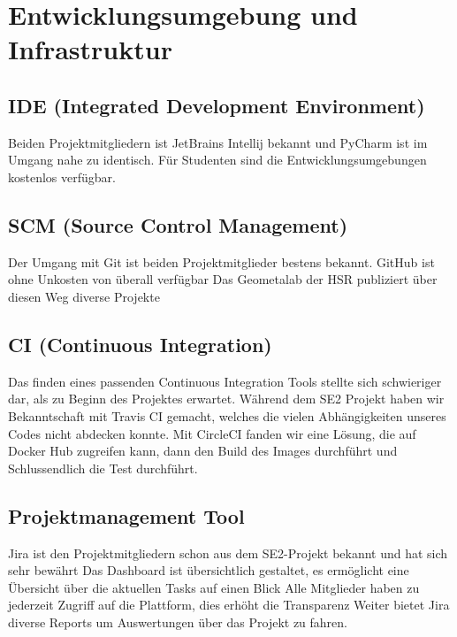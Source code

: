 \section{Entwicklungsumgebung und Infrastruktur}
\subsection{IDE (Integrated Development Environment)}
Beiden Projektmitgliedern ist JetBrains Intellij bekannt und PyCharm ist im Umgang nahe zu identisch.
Für Studenten sind die Entwicklungsumgebungen kostenlos verfügbar.
\subsection{SCM (Source Control Management)}
Der Umgang mit Git ist beiden Projektmitglieder bestens bekannt.
GitHub ist ohne Unkosten von überall verfügbar
Das Geometalab der HSR publiziert über diesen Weg diverse Projekte

\subsection{CI (Continuous Integration)}
Das finden eines passenden Continuous Integration Tools stellte sich schwieriger dar, als zu Beginn des Projektes erwartet. Während dem SE2 Projekt haben wir Bekanntschaft mit Travis CI gemacht, welches die vielen Abhängigkeiten unseres Codes nicht abdecken konnte. Mit CircleCI fanden wir eine Lösung, die auf Docker Hub zugreifen kann, dann den Build des Images durchführt und Schlussendlich die Test durchführt.

\subsection{Projektmanagement Tool}
Jira ist den Projektmitgliedern schon aus dem SE2-Projekt bekannt und hat sich sehr bewährt
Das Dashboard ist übersichtlich gestaltet, es ermöglicht eine Übersicht über die aktuellen Tasks auf einen Blick
Alle Mitglieder haben zu jederzeit Zugriff auf die Plattform, dies erhöht die Transparenz
Weiter bietet Jira diverse Reports um Auswertungen über das Projekt zu fahren.
